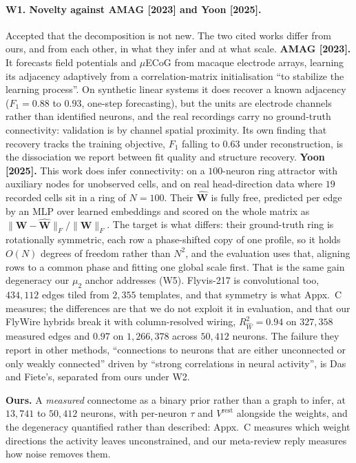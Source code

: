 \documentclass[11pt]{article}
\newcommand{\Rw}{R^2_{\widehat W}}
\newcommand{\Mat}[1]{\mathbf{#1}}
\begin{document}
\paragraph{W1. Novelty against AMAG [2023] and Yoon [2025].}
Accepted that the decomposition is not new. The two cited works differ from
ours, and from each other, in what they infer and at what scale.
\label{link11}
\textbf{AMAG [2023].} It forecasts field potentials and $\mu$ECoG from macaque
electrode arrays, learning its adjacency adaptively from a correlation-matrix
initialisation ``to stabilize the learning process''. On synthetic linear systems
it does recover a known adjacency ($F_1 = 0.88$ to $0.93$, one-step forecasting),
but the units are electrode channels rather than identified neurons, and the real
recordings carry no ground-truth connectivity: validation is by channel spatial
proximity. Its own finding that recovery tracks the training
objective, $F_1$ falling to $0.63$ under reconstruction, is the dissociation we
report between fit quality and structure recovery.
\label{link12}
\textbf{Yoon [2025].} This work does infer connectivity: on a $100$-neuron ring
attractor with auxiliary nodes for unobserved cells, and on real head-direction
data where $19$ recorded cells sit in a ring of $N = 100$. Their
$\widehat{\Mat{W}}$ is fully free, predicted per edge by an MLP over learned
embeddings and scored on the whole matrix as
$\|\Mat{W}-\widehat{\Mat{W}}\|_F/\|\Mat{W}\|_F$. The target is what differs: their
ground-truth ring is rotationally symmetric, each row a phase-shifted copy of one
profile, so it holds $O(N)$ degrees of freedom rather than $N^2$, and the
evaluation uses that, aligning rows to a common phase and fitting one global
scale first. That is the same gain degeneracy our $\mu_2$ anchor addresses (W5).
Flyvis-217 is convolutional too, $434{,}112$ edges tiled from $2{,}355$
templates, and that symmetry is what Appx.~C measures; the differences are that
we do not exploit it in evaluation, and that our FlyWire hybrids break it with
column-resolved wiring, $\Rw = 0.94$ on $327{,}358$ measured edges and $0.97$ on
$1{,}266{,}378$ across $50{,}412$ neurons. The failure
they report in other methods, ``connections to neurons that are either
unconnected or only weakly connected'' driven by ``strong correlations in neural
activity'', is Das and Fiete's, separated from ours under W2.

\textbf{Ours.} A \emph{measured} connectome as a binary prior rather than a graph
to infer, at $13{,}741$ to $50{,}412$ neurons, with per-neuron $\tau$ and
$V^{\mathrm{rest}}$ alongside the weights, and the degeneracy quantified rather
than described: Appx.~C measures which weight directions the activity leaves
unconstrained, and our meta-review reply measures how noise removes them.
\end{document}
